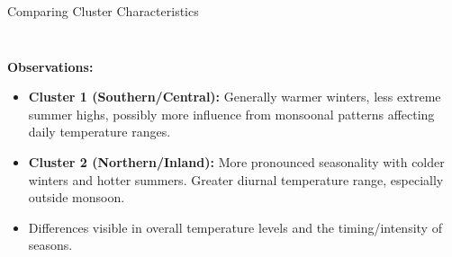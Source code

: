 \documentclass[svgnames, 12pt]{beamer}
\begin{document}
\begin{frame}{Comparing Cluster Characteristics}
\begin{columns}[T]
\begin{column}{0.5\textwidth}
\begin{figure}
      \end{figure}
    \end{column}
  \end{columns}
  \textbf{Observations:}
  \begin{itemize}
    \item \textbf{Cluster 1 (Southern/Central):} Generally warmer winters, less extreme summer highs, possibly more influence from monsoonal patterns affecting daily temperature ranges.
    \item \textbf{Cluster 2 (Northern/Inland):} More pronounced seasonality with colder winters and hotter summers. Greater diurnal temperature range, especially outside monsoon.
    \item Differences visible in overall temperature levels and the timing/intensity of seasons.
  \end{itemize}
\end{frame}

\end{document}
